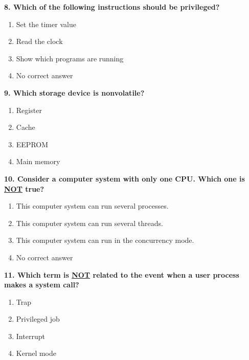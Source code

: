 \documentclass[12pt]{article}
\begin{document}
\noindent \textbf{8. Which of the following instructions should be privileged?}
\begin{enumerate}[label=\alph*)]
    \item Set the timer value
    \item Read the clock
    \item Show which programs are running
    \item No correct answer
\end{enumerate} \vspace{15pt}

\noindent \textbf{9. Which storage device is nonvolatile?}
\begin{enumerate}[label=\alph*)]
    \item Register
    \item Cache
    \item EEPROM
    \item Main memory
\end{enumerate} \vspace{15pt}
\noindent \textbf{10. Consider a computer system with only one CPU. Which one is \underline{NOT} true?}
\begin{enumerate}[label=\alph*)]
    \item This computer system can run several processes.
    \item This computer system can run several threads.
    \item This computer system can run in the concurrency mode.
    \item No correct answer
\end{enumerate} \vspace{15pt}

\noindent \textbf{11. Which term is \underline{NOT} related to the event when a user process makes a system call?}
\begin{enumerate}[label=\alph*)]
\item Trap
\item Privileged job
\item Interrupt
\item Kernel mode
\end{enumerate} \vspace{15pt}
\end{document}
